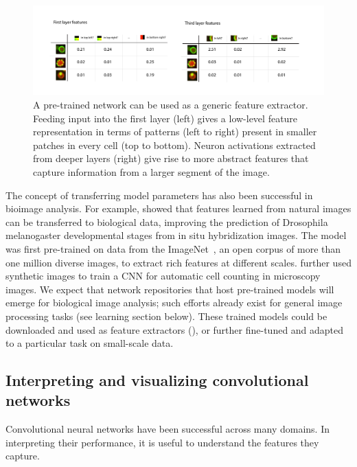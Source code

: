 \begin{figure}[htbp!]
\centering
\includegraphics[width=1.0\textwidth]{image_pretrain}
\caption[Feature extraction with pre-trained convolutional neural networks.]{A pre-trained network can be used as a generic feature extractor. Feeding input into the first layer (left) gives a low-level feature representation in terms of patterns (left to right) present in smaller patches in every cell (top to bottom). Neuron activations extracted from deeper layers (right) give rise to more abstract features that capture information from a larger segment of the image.}
\label{fig:dl_image_pretrain}
\end{figure}

The concept of transferring model parameters has also been successful in bioimage analysis. For example, \citet{zhang_deep_2015} showed that features learned from natural images can be transferred to biological data, improving the prediction of Drosophila melanogaster developmental stages from in situ hybridization images. The model was first pre-trained on data from the ImageNet~\citep{russakovsky_imagenet_2015}, an open corpus of more than one million diverse images, to extract rich features at different scales. \citet{xie_beyond_2015} further used synthetic images to train a CNN for automatic cell counting in microscopy images. We expect that network repositories that host pre-trained models will emerge for biological image analysis; such efforts already exist for general image processing tasks (see learning section below). These trained models could be downloaded and used as feature extractors (), or further fine-tuned and adapted to a particular task on small-scale data.


\subsection{Interpreting and visualizing convolutional networks} \label{sec:dl_inter}
Convolutional neural networks have been successful across many domains. In interpreting their performance, it is useful to understand the features they capture.


